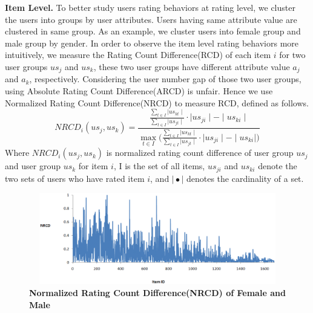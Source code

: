 \documentclass{llncs}
\begin{document}
	\noindent\textbf{Item Level.} To better study users rating behaviors at rating level,
	we cluster the users into groups by user attributes. Users having same attribute value are
	clustered in same group. As an example, we cluster users into female group and male group by gender.
	In order to observe the item level rating behaviors more intuitively,
	we measure the Rating Count Difference(RCD) of each item $i$ for two user groups $us_j$ and $us_k$,
	these two user groups have different attribute value $a_j$ and $a_k$, respectively.
	Considering the user number gap of those two user groups, using Absolute Rating Count Difference(ARCD) is unfair.
	Hence we use Normalized Rating Count Difference(NRCD) to measure RCD, defined as follows.
	\begin{equation}
		NRCD_i(us_j, us_k) =\frac {\frac {\sum\limits_{t \in I} {\mid us_{kt}\mid}}{\sum\limits_{t \in I}{\mid us_{jt}\mid}}\cdot\mid us_{ji}\mid - \mid us_{ki}\mid} {\max\limits_{t \in I} ({{\frac {\sum\limits_{t \in I}{\mid us_{kt}\mid}}{\sum\limits_{t \in I}{\mid us_{jt}\mid}}\cdot\mid us_{ji}\mid - \mid us_{ki}\mid)}}}
	\end{equation}
	Where $NRCD_i(us_j, us_k)$ is normalized rating count difference of user group $us_j$ and user group $us_k$ for item $i$,
	I is the set of all items,
	$us_{ji}$ and $us_{ki}$  denote the two sets of users who have rated item $i$,
	and $\mid\bullet\mid$ denotes the cardinality of a set.
	
	\begin{figure}
		\centering
		\begin{minipage}{0.48\linewidth}
			\centerline{\includegraphics[height=4cm, width=12cm]{gender_female_male_RCD.eps}}
		\end{minipage}
		\caption{\textbf{Normalized Rating Count Difference(NRCD) of Female and Male }}
	\end{figure}
	
\end{document}
